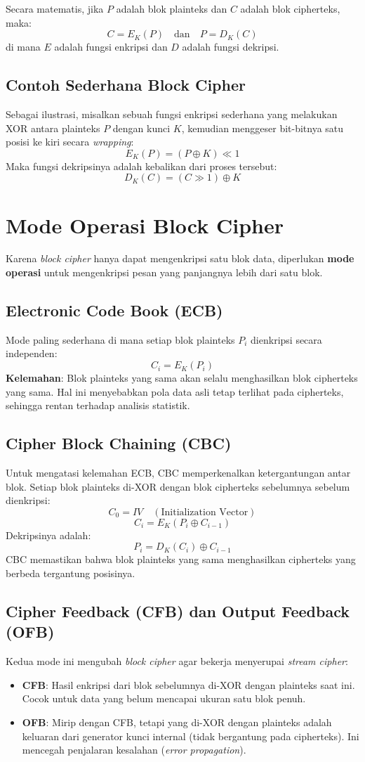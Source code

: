 \documentclass[../main.tex]{subfiles}
\begin{document}
Secara matematis, jika $P$ adalah blok plainteks dan $C$ adalah blok cipherteks, maka:
\[ C = E_K(P) \quad \text{dan} \quad P = D_K(C) \]
di mana $E$ adalah fungsi enkripsi dan $D$ adalah fungsi dekripsi.

\subsection{Contoh Sederhana Block Cipher}
Sebagai ilustrasi, misalkan sebuah fungsi enkripsi sederhana yang melakukan XOR antara plainteks $P$ dengan kunci $K$, kemudian menggeser bit-bitnya satu posisi ke kiri secara \textit{wrapping}:
\[ E_K(P) = (P \oplus K) \ll 1 \]
Maka fungsi dekripsinya adalah kebalikan dari proses tersebut:
\[ D_K(C) = (C \gg 1) \oplus K \]

\section{Mode Operasi Block Cipher}
Karena \textit{block cipher} hanya dapat mengenkripsi satu blok data, diperlukan \textbf{mode operasi} untuk mengenkripsi pesan yang panjangnya lebih dari satu blok.

\subsection{Electronic Code Book (ECB)}
Mode paling sederhana di mana setiap blok plainteks $P_i$ dienkripsi secara independen:
\[ C_i = E_K(P_i) \]
\textbf{Kelemahan}: Blok plainteks yang sama akan selalu menghasilkan blok cipherteks yang sama. Hal ini menyebabkan pola data asli tetap terlihat pada cipherteks, sehingga rentan terhadap analisis statistik.

\subsection{Cipher Block Chaining (CBC)}
Untuk mengatasi kelemahan ECB, CBC memperkenalkan ketergantungan antar blok. Setiap blok plainteks di-XOR dengan blok cipherteks sebelumnya sebelum dienkripsi:
\[ C_0 = IV \quad (\text{Initialization Vector}) \]
\[ C_i = E_K(P_i \oplus C_{i-1}) \]
Dekripsinya adalah:
\[ P_i = D_K(C_i) \oplus C_{i-1} \]
CBC memastikan bahwa blok plainteks yang sama menghasilkan cipherteks yang berbeda tergantung posisinya.

\subsection{Cipher Feedback (CFB) dan Output Feedback (OFB)}
Kedua mode ini mengubah \textit{block cipher} agar bekerja menyerupai \textit{stream cipher}:
\begin{itemize}
    \item \textbf{CFB}: Hasil enkripsi dari blok sebelumnya di-XOR dengan plainteks saat ini. Cocok untuk data yang belum mencapai ukuran satu blok penuh.
    \item \textbf{OFB}: Mirip dengan CFB, tetapi yang di-XOR dengan plainteks adalah keluaran dari generator kunci internal (tidak bergantung pada cipherteks). Ini mencegah penjalaran kesalahan (\textit{error propagation}).
\end{itemize}
\end{document}
